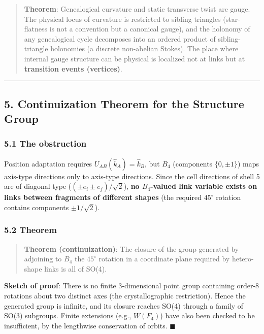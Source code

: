 \documentclass[
]{article}
\begin{document}
\begin{quote}
\textbf{Theorem}: Genealogical curvature and static transverse twist are
gauge. The physical locus of curvature is restricted to sibling
triangles (star-flatness is not a convention but a canonical gauge), and
the holonomy of any genealogical cycle decomposes into an ordered
product of sibling-triangle holonomies (a discrete non-abelian Stokes).
The place where internal gauge structure can be physical is localized
not at links but at \textbf{transition events (vertices)}.
\end{quote}

\begin{center}\rule{0.5\linewidth}{0.5pt}\end{center}

\subsection{5. Continuization Theorem for the Structure
Group}\label{continuization-theorem-for-the-structure-group}

\subsubsection{5.1 The obstruction}\label{the-obstruction}

Position adaptation requires \(U_{AB}(\hat k_A)=\hat k_B\), but \(B_4\)
(components \(\{0,\pm1\}\)) maps axis-type directions only to axis-type
directions. Since the cell directions of shell 5 are of diagonal type
(\((\pm e_i\pm e_j)/\sqrt2\)), \textbf{no \(B_4\)-valued link variable
exists on links between fragments of different shapes} (the required
\(45^\circ\) rotation contains components \(\pm1/\sqrt2\)).

\subsubsection{5.2 Theorem}\label{theorem}

\begin{quote}
\textbf{Theorem (continuization)}: The closure of the group generated by
adjoining to \(B_4\) the \(45^\circ\) rotation in a coordinate plane
required by hetero-shape links is all of SO(4).
\end{quote}

\textbf{Sketch of proof}: There is no finite 3-dimensional point group
containing order-8 rotations about two distinct axes (the
crystallographic restriction). Hence the generated group is infinite,
and its closure reaches SO(4) through a family of SO(3) subgroups.
Finite extensions (e.g., \(W(F_4)\)) have also been checked to be
insufficient, by the lengthwise conservation of orbits. \(\blacksquare\)
\end{document}
